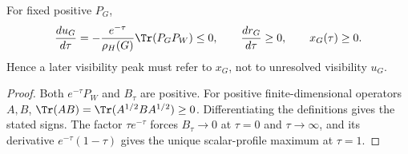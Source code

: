 \documentclass[12pt,a4paper]{article}
\begin{document}
\begin{lemma}
\label{p8:lem:visibility-monotonicity-band}
For fixed positive \(P_G\),
\[
\frac{du_G}{d\tau}
=-\frac{e^{-\tau}}{\rho_H(G)}\Tr(P_GP_W)\le0,
\qquad
\frac{dr_G}{d\tau}\ge0,
\qquad
x_G(\tau)\ge0.
\]
Hence a later visibility peak must refer to \(x_G\), not to unresolved visibility \(u_G\).
\end{lemma}

\begin{proof}
Both \(e^{-\tau}P_W\) and \(B_\tau\) are positive.  For positive finite-dimensional operators \(A,B\), \(\Tr(AB)=\Tr(A^{1/2}BA^{1/2})\ge0\).  Differentiating the definitions gives the stated signs.  The factor \(\tau e^{-\tau}\) forces \(B_\tau\to0\) at \(\tau=0\) and \(\tau\to\infty\), and its derivative \(e^{-\tau}(1-\tau)\) gives the unique scalar-profile maximum at \(\tau=1\).
\end{proof}
\end{document}
